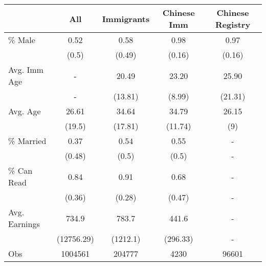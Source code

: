 \begin{tabular}{lcccc}
  \hline
 & All & Immigrants & Chinese Imm & Chinese Registry \\ 
  \hline
\% Male & 0.52 & 0.58 & 0.98 & 0.97 \\ 
   & (0.5) & (0.49) & (0.16) & (0.16) \\ 
  Avg. Imm Age & - & 20.49 & 23.20 & 25.90 \\ 
    & - & (13.81) & (8.99) & (21.31) \\ 
  Avg. Age & 26.61 & 34.64 & 34.79 & 26.15 \\ 
     & (19.5) & (17.81) & (11.74) & (9) \\ 
  \% Married & 0.37 & 0.54 & 0.55 & - \\ 
      & (0.48) & (0.5) & (0.5) & - \\ 
  \% Can Read & 0.84 & 0.91 & 0.68 & - \\ 
        & (0.36) & (0.28) & (0.47) & - \\ 
  Avg. Earnings & 734.9 & 783.7 & 441.6 & - \\ 
           & (12756.29) & (1212.1) & (296.33) & - \\ 
   \hline
Obs & 1004561 &  204777 &    4230 &   96601 \\ 
   \hline
\end{tabular}
